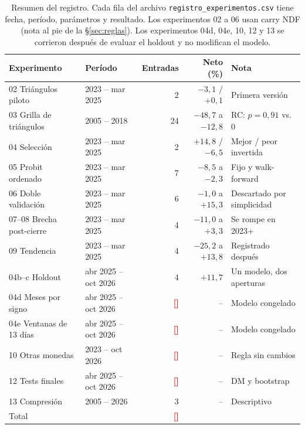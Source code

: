 \documentclass[10pt,a4paper]{article}
\newcommand{\completar}[1]{\textcolor{red}{\textbf{[#1]}}}
\begin{document}
\begin{table}[htbp]\centering\small
\begin{tabular}{@{}llrrl@{}}
\toprule
Experimento & Período & Entradas & Neto (\%) & Nota \\
\midrule
02 Triángulos piloto     & 2023 -- mar 2025 & 2  & $-3{,}1$ / $+0{,}1$ & Primera versión \\
03 Grilla de triángulos  & 2005 -- 2018     & 24 & $-48{,}7$ a $-12{,}8$ & RC: $p=0{,}91$ vs. 0 \\
04 Selección             & 2023 -- mar 2025 & 2  & $+14{,}8$ / $-6{,}5$ & Mejor / peor invertida \\
05 Probit ordenado       & 2023 -- mar 2025 & 7  & $-8{,}5$ a $-2{,}3$ & Fijo y walk-forward \\
06 Doble validación      & 2023 -- mar 2025 & 6  & $-1{,}0$ a $+15{,}3$ & Descartado por simplicidad \\
07--08 Brecha post-cierre & 2023 -- mar 2025 & 4 & $-11{,}0$ a $+3{,}3$ & Se rompe en 2023+ \\
09 Tendencia             & 2023 -- mar 2025 & 4  & $-25{,}2$ a $+13{,}8$ & Registrado después \\
\midrule
04b--c Holdout           & abr 2025 -- oct 2026 & 4 & $+11{,}7$ & Un modelo, dos aperturas \\
\midrule
04d Meses por signo      & abr 2025 -- oct 2026 & \completar{} & -- & Modelo congelado \\
04e Ventanas de 13 días  & abr 2025 -- oct 2026 & \completar{} & -- & Modelo congelado \\
10 Otras monedas         & 2023 -- oct 2026 & \completar{} & -- & Regla sin cambios \\
12 Tests finales         & abr 2025 -- oct 2026 & \completar{} & -- & DM y bootstrap \\
13 Compresión            & 2005 -- 2026     & 3  & -- & Descriptivo \\
\midrule
Total                    &                  & \completar{} & & \\
\bottomrule
\end{tabular}
\caption{Resumen del registro. Cada fila del archivo
\texttt{registro\_experimentos.csv} tiene fecha, período, parámetros y resultado.
Los experimentos 02 a 06 usan carry NDF (nota al pie de la §\ref{sec:reglas}). Los
experimentos 04d, 04e, 10, 12 y 13 se corrieron después de evaluar el holdout y
no modifican el modelo.}
\end{table}
\end{document}
